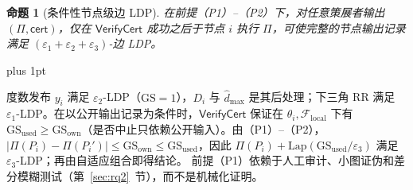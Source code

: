 \documentclass[11pt]{article}
\makeatletter
\newlength{\zhindent}
\theoremstyle{ieeeitalic}
\newtheorem{proposition}{命题}
\renewcommand{\proofname}{证明}
\renewenvironment{proof}[1][\proofname]{\par
  \pushQED{\qed}%
  \normalfont\topsep3pt plus 1pt\relax
  \trivlist
  \item[\hskip\labelsep\hspace*{\zhindent}\bfseries\itshape #1：]\itshape\ignorespaces
}{%
  \popQED\endtrivlist\@endpefalse
}
\newcommand{\GS}{\mathrm{GS}}
\newcommand{\dhatmax}{\hat{d}_{\max}}
\newcommand{\Lap}{\mathrm{Lap}}
\newcommand{\VerifyCert}{\mathsf{VerifyCert}}
\makeatother
\begin{document}
\begin{proposition}[条件性节点级边 LDP]
\label{prop:privacy}
在前提（P1）--（P2）下，对任意策展者输出 $(\Pi, \mathsf{cert})$，仅在 $\VerifyCert$ 成功之后于节点 $i$ 执行 $\Pi$，可使完整的节点输出记录满足 $(\varepsilon_1+\varepsilon_2+\varepsilon_3)$-边 LDP。
\end{proposition}
\begin{proof}[证明概要]
度数发布 $y_i$ 满足 $\varepsilon_2$-LDP（$\GS=1$），$D_i$ 与 $\dhatmax$ 是其后处理；下三角 RR 满足 $\varepsilon_1$-LDP。在以公开输出记录为条件时，$\VerifyCert$ 保证在 $\theta_i, \mathcal{F}_{\mathrm{local}}$ 下有 $\GS_{\mathrm{used}} \ge \GS_{\mathrm{own}}$（是否中止只依赖公开输入）。由（P1）--（P2），$|\Pi(P_i) - \Pi(P_i')| \le \GS_{\mathrm{own}} \le \GS_{\mathrm{used}}$，因此 $\Pi(P_i) + \Lap(\GS_{\mathrm{used}}/\varepsilon_3)$ 满足 $\varepsilon_3$-LDP；再由自适应组合即得结论。
\end{proof}
前提（P1）依赖于人工审计、小图证伪和差分模糊测试（第~\ref{sec:rq2}~节），而不是机械化证明。
\end{document}
